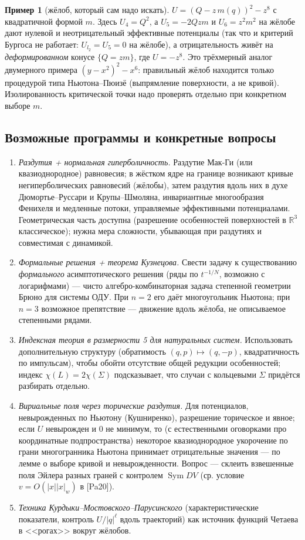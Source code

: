 \documentclass[11pt,a4paper]{article}
\theoremstyle{definition}
\newtheorem{example}[theorem]{Пример}
\newcommand{\R}{\mathbb R}
\DeclareMathOperator{\Sym}{Sym}
\begin{document}
\begin{example}[жёлоб, который сам надо искать]
$U=(Q-z\,m(q))^2-z^8$ с квадратичной формой $m$. Здесь $U_4=Q^2$, а $U_5=-2Qzm$ и $U_6=z^2m^2$ на жёлобе
дают нулевой и неотрицательный эффективные потенциалы (так что и критерий Бургоса не работает:
$U_{l_2}=U_5=0$ на жёлобе), а отрицательность живёт на \emph{деформированном} конусе $\{Q=zm\}$,
где $U=-z^8$. Это трёхмерный аналог двумерного примера $(y-x^2)^2-x^6$: правильный
жёлоб находится только процедурой типа Ньютона--Пюизё (выпрямление поверхности, а не кривой).
Изолированность критической точки надо проверять отдельно при конкретном выборе $m$.
\end{example}

\subsection{Возможные программы и конкретные вопросы}
\begin{enumerate}[leftmargin=*,label=(P\arabic*)]
\item \emph{Раздутия + нормальная гиперболичность.} Раздутие Мак-Ги (или квазиоднородное) равновесия;
в жёстком ядре на границе возникают кривые негиперболических равновесий (жёлобы), затем раздутия
вдоль них в духе Дюмортье--Руссари и Крупы--Шмоляна, инвариантные многообразия Фенихеля и медленные
потоки, управляемые эффективными потенциалами. Геометрическая часть доступна (разрешение особенностей
поверхностей в $\R^3$ классическое); нужна мера сложности, убывающая при раздутиях и совместимая
с динамикой.
\item \emph{Формальные решения + теорема Кузнецова.} Свести задачу к существованию \emph{формального}
асимптотического решения (ряды по $t^{-1/N}$, возможно с логарифмами) --- чисто алгебро-комбинаторная
задача степенной геометрии Брюно для системы ОДУ. При $n=2$ его даёт многоугольник Ньютона; при $n=3$
возможное препятствие --- движение вдоль жёлоба, не описываемое степенными рядами.
\item \emph{Индексная теория в размерности 5 для натуральных систем.} Использовать дополнительную
структуру (обратимость $(q,p)\mapsto(q,-p)$, квадратичность по импульсам), чтобы обойти отсутствие общей
редукции особенностей; индекс $\chi(L)=2\chi(\Sigma)$ подсказывает, что случаи с кольцевыми $\Sigma$
придётся разбирать отдельно.
\item \emph{Вириальные поля через торические раздутия.} Для потенциалов, невырожденных по Ньютону
(Кушниренко), разрешение торическое и явное; если $U$ невырожден и $0$ не минимум, то (с естественными
оговорками про координатные подпространства) некоторое квазиоднородное укорочение по грани многогранника
Ньютона принимает отрицательные значения --- по лемме о выборе кривой и невырожденности. Вопрос ---
склеить взвешенные поля Эйлера разных граней с контролем $\Sym DV$ (ср. условие $v=O(|x||x|_w)$ в [Pa20]).
\item \emph{Техника Курдыки--Мостовского--Парусинского} (характеристические показатели, контроль $U/|q|^\ell$
вдоль траекторий) как источник функций Четаева в <<рогах>> вокруг жёлобов.
\end{enumerate}
\end{document}
